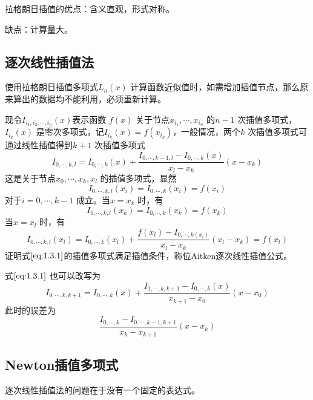 \documentclass[a4paper]{article}
\begin{document}
拉格朗日插值的优点：含义直观，形式对称。

缺点：计算量大。

\subsection{逐次线性插值法}
使用拉格朗日插值多项式$L_n(x)$ 计算函数近似值时，如需增加插值节点，那么原来算出的数据均不能利用，必须重新计算。

现令$I_{i_1, i_2, \cdots, i_n}(x)$表示函数 $f(x)$ 关于节点$x_{i_1},\cdots,x_{i_n}$ 的$n-1$ 次插值多项式，$I_{i_k}(x)$ 是零次多项式，记$I_{i_k}(x) = f(x_{i_k})$，一般情况，两个$k$ 次插值多项式可通过线性插值得到$k+1$ 次插值多项式
\[
	I_{0,\cdots,k,l} = I_{0,\cdots,k}(x) + \frac {I_{0,\cdots,k-1,l} - I_{0,\cdots,k}(x)} {x_l - x_k} (x - x_k) \tag{1.3.1} \label{eq:1.3.1}
\] 
这是关于节点$x_0, \cdots, x_k, x_l$ 的插值多项式，显然
\[
	I_{0,\cdots,k,l}(x_i) = I_{0,\cdots,k}(x_i) = f(x_i)
\] 
对于$i=0,\cdots,k-1$ 成立。当$x=x_k$ 时，有
\[
	I_{0,\cdots,k,l}(x_k) = I_{0,\cdots,k}(x_k) = f(x_k)
\] 
当$x = x_l$ 时，有
\[
	I_{0,\cdots,k,l}(x_l) = I_{0,\cdots,k}(x_l) + \frac{f(x_l) - I_{0,\cdots,k(x_l)}}{x_l - x_k}(x_l - x_k) = f(x_l)
\] 
证明式$\ref{eq:1.3.1}$的插值多项式满足插值条件，称位Aitken逐次线性插值公式。

式$\ref{eq:1.3.1}$ 也可以改写为
\[
	I_{0,\cdots,k,k+1} = I_{0,\cdots,k}(x) + \frac {I_{1,\cdots,k,k+1} - I_{0,\cdots,k}(x)} {x_{k+1} - x_0} (x - x_0) \tag{1.3.2} \label{eq:1.3.2}
\] 
此时的误差为
\[
	\frac{I_{0,\cdots,k} - I_{0,\cdots,k-1,k+1}}{x_k - x_{k+1}} (x - x_k)
\] 
\subsection{Newton插值多项式}
逐次线性插值法的问题在于没有一个固定的表达式。
\end{document}

